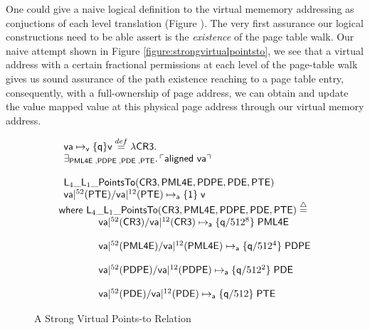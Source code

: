 \begin{remark}
  \label{rem:strongvmem}
  One could give a naive logical definition to the virtual mememory addressing as conjuctions of each level translation (Figure ). The very first assurance our logical constructions need to be able assert is the \textit{existence} of the page table walk. Our naive attempt shown in Figure \ref{figure:strongvirtualpointsto}, we see that a virtual address with a certain fractional permissions at each level of the page-table walk gives us sound assurance of the path existence reaching to a page table entry, consequently, with a full-ownership of page address, we can obtain and update the value mapped value at this physical page address through our virtual memory address. 

\begin{figure*}
  \[
  \begin{array}{l}
\begin{array}{l}
  \mathsf{va}\mapsto_{\textsf{v}}\{\textsf{q}\}\textsf{v} \stackrel{def}{=} \lambda \textsf{CR3}.\\
  \exists_{\textsf{PML4E} \;, \textsf{PDPE} \;, \textsf{PDE} \;,\textsf{PTE}} \ldotp 

  \ulcorner \textsf{aligned } \mathsf{va} \urcorner \\  \\
  \textsf{L}_{4}\_\textsf{L}_{1}\_\textsf{PointsTo}(\textsf{CR3},\textsf{PML4E},\textsf{PDPE},\textsf{PDE},\textsf{PTE})\\
   \mathsf{va}|^{52}(\textsf{PTE}) / \mathsf{va}|^{12}(\textsf{PTE}) \mapsto_{\mathsf{a}}\{\mathsf{1}\}\;\textsf{v} 
\end{array} \\

\textsf{where   }\textsf{L}_{4}\_\textsf{L}_{1}\_\textsf{PointsTo}(\textsf{CR3},\textsf{PML4E},\textsf{PDPE},\textsf{PDE},\textsf{PTE}) \stackrel{\triangle}{=} \\
 \qquad\qquad \mathsf{va}|^{52}(\textsf{CR3}) / \mathsf{va}|^{12}(\textsf{CR3}) \mapsto_{\mathsf{a}}\{\mathsf{q}/512^{8}\}\;\textsf{PML4E} \\ \\ 
 \qquad\qquad  \mathsf{va}|^{52}(\textsf{PML4E}) / \mathsf{va}|^{12}(\textsf{PML4E}) \mapsto_{\mathsf{a}}\{\mathsf{q}/512^{4}\}\;\textsf{PDPE}  \\  \\
  \qquad\qquad \mathsf{va}|^{52}(\textsf{PDPE}) / \mathsf{va}|^{12}(\textsf{PDPE}) \mapsto_{\mathsf{a}}\{\mathsf{q}/512^{2}\}\;\textsf{PDE} \\ \\
  \qquad\qquad \mathsf{va}|^{52}(\textsf{PDE}) / \mathsf{va}|^{12}(\textsf{PDE}) \mapsto_{\mathsf{a}}\{\mathsf{q}/512\}\;\textsf{PTE} 
   \end{array}
\]
\caption{A Strong Virtual Points-to Relation}
  \label{fig:strongvirtualpointsto}
\end{figure*}
\end{remark}

